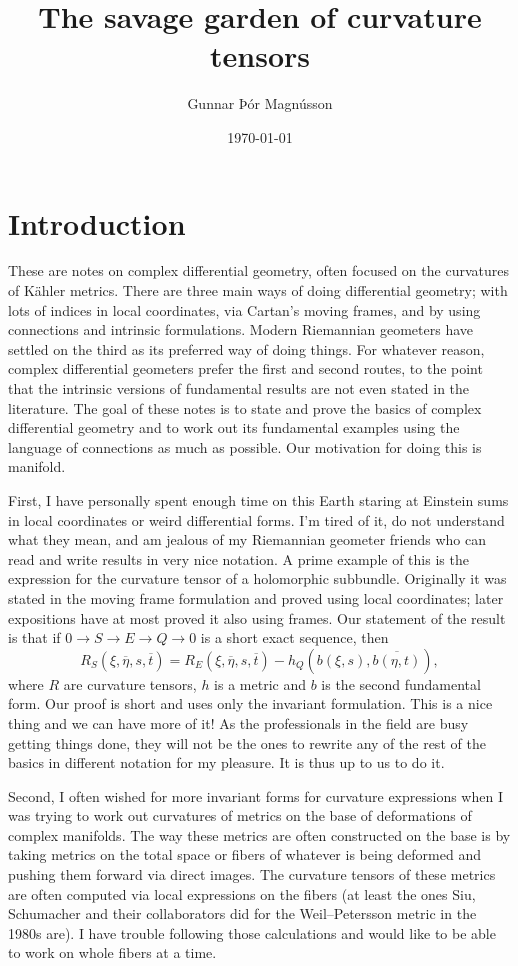 \documentclass[11pt]{article}
\author{Gunnar Þór Magnússon}
\date{\today}
\title{The savage garden of curvature tensors}
\begin{document}
\maketitle



\section*{Introduction}
\label{sec:introduction}

These are notes on complex differential geometry, often focused on the curvatures of K\"ahler metrics. There are three main ways of doing differential geometry; with lots of indices in local coordinates, via Cartan's moving frames, and by using connections and intrinsic formulations. Modern Riemannian geometers have settled on the third as its preferred way of doing things. For whatever reason, complex differential geometers prefer the first and second routes, to the point that the intrinsic versions of fundamental results are not even stated in the literature. The goal of these notes is to state and prove the basics of complex differential geometry and to work out its fundamental examples using the language of connections as much as possible. Our motivation for doing this is manifold.

First, I have personally spent enough time on this Earth staring at Einstein sums in local coordinates or weird differential forms. I'm tired of it, do not understand what they mean, and am jealous of my Riemannian geometer friends who can read and write results in very nice notation. A prime example of this is the expression for the curvature tensor of a holomorphic subbundle. Originally it was stated in the moving frame formulation and proved using local coordinates; later expositions have at most proved it also using frames. Our statement of the result is that if $0 \to S \to E \to Q \to 0$ is a short exact sequence, then
\[
R_S(\xi,\overline\eta,s,\overline t)
= R_E(\xi,\overline\eta,s,\overline t)
- h_Q(b(\xi,s),\overline{b(\eta,t)}),
\]
where $R$ are curvature tensors, $h$ is a metric and $b$ is the second fundamental form. Our proof is short and uses only the invariant formulation. This is a nice thing and we can have more of it!
As the professionals in the field are busy getting things done, they will not be the ones to rewrite any of the rest of the basics in different notation for my pleasure. It is thus up to us to do it.

Second, I often wished for more invariant forms for curvature expressions when I was trying to work out curvatures of metrics on the base of deformations of complex manifolds. The way these metrics are often constructed on the base is by taking metrics on the total space or fibers of whatever is being deformed and pushing them forward via direct images. The curvature tensors of these metrics are often computed via local expressions on the fibers (at least the ones Siu, Schumacher and their collaborators did for the Weil--Petersson metric in the 1980s are). I have trouble following those calculations and would like to be able to work on whole fibers at a time.
\end{document}
